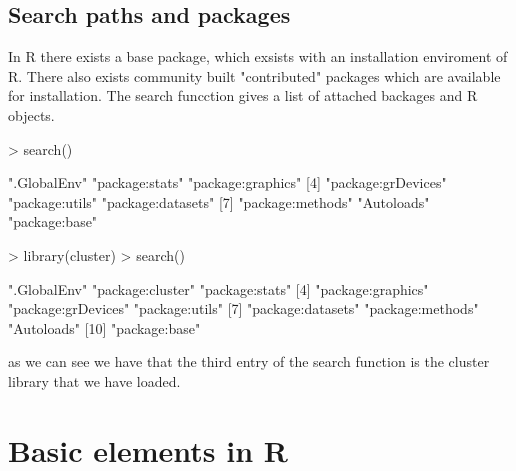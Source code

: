 \documentclass[twoside]{article}
\theoremstyle{definition}
\theoremstyle{definition}
\begin{document}
\subsection{Search paths and packages}
In R there exists a base package, which exsists with an installation enviroment of R. There also exists community built "contributed" packages which are available for installation. The search funcction gives a list of attached backages and R objects. 
\begin{Schunk}
\begin{Sinput}
> search()
\end{Sinput}
\begin{Soutput}
[1] ".GlobalEnv"        "package:stats"     "package:graphics" 
[4] "package:grDevices" "package:utils"     "package:datasets" 
[7] "package:methods"   "Autoloads"         "package:base"     
\end{Soutput}
\begin{Sinput}
> library(cluster)
> search()
\end{Sinput}
\begin{Soutput}
 [1] ".GlobalEnv"        "package:cluster"   "package:stats"    
 [4] "package:graphics"  "package:grDevices" "package:utils"    
 [7] "package:datasets"  "package:methods"   "Autoloads"        
[10] "package:base"     
\end{Soutput}
\end{Schunk}
as we can see we have that the third entry of the search function is the cluster library that we have loaded.
\section{Basic elements in R}
\end{document}
